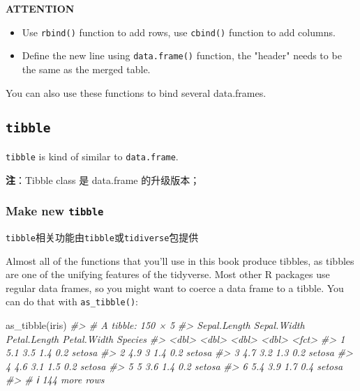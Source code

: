 \documentclass[
]{article}
\newenvironment{Shaded}{}{}
\newcommand{\CommentTok}[1]{\textcolor[rgb]{0.38,0.63,0.69}{\textit{#1}}}
\newcommand{\FunctionTok}[1]{\textcolor[rgb]{0.02,0.16,0.49}{#1}}
\newcommand{\NormalTok}[1]{#1}
\begin{document}
\newpage
\textbf{ATTENTION}

\begin{itemize}
\item
  Use \texttt{rbind()} function to add rows, use \texttt{cbind()}
  function to add columns.
\item
  Define the new line using \texttt{data.frame()} function, the "header"
  needs to be the same as the merged table.
\end{itemize}

You can also use these functions to bind several data.frames.

\hypertarget{tibble}{%
\subsection{\texorpdfstring{\texttt{tibble}}{tibble}}\label{tibble}}

\texttt{tibble} is kind of similar to \texttt{data.frame}.

\textbf{注}：Tibble class 是 data.frame 的升级版本；

\hypertarget{make-new-tibble}{%
\subsubsection{\texorpdfstring{Make new
\texttt{tibble}}{Make new tibble}}\label{make-new-tibble}}

\texttt{tibble}相关功能由\texttt{tibble}或\texttt{tidiverse}包提供

Almost all of the functions that you'll use in this book produce
tibbles, as tibbles are one of the unifying features of the tidyverse.
Most other R packages use regular data frames, so you might want to
coerce a data frame to a tibble. You can do that with
\texttt{as\_tibble()}:

\begin{Shaded}
\begin{Highlighting}[]
\FunctionTok{as\_tibble}\NormalTok{(iris)}
\CommentTok{\#\textgreater{} \# A tibble: 150 × 5}
\CommentTok{\#\textgreater{}   Sepal.Length Sepal.Width Petal.Length Petal.Width Species}
\CommentTok{\#\textgreater{}          \textless{}dbl\textgreater{}       \textless{}dbl\textgreater{}        \textless{}dbl\textgreater{}       \textless{}dbl\textgreater{} \textless{}fct\textgreater{}  }
\CommentTok{\#\textgreater{} 1          5.1         3.5          1.4         0.2 setosa }
\CommentTok{\#\textgreater{} 2          4.9         3            1.4         0.2 setosa }
\CommentTok{\#\textgreater{} 3          4.7         3.2          1.3         0.2 setosa }
\CommentTok{\#\textgreater{} 4          4.6         3.1          1.5         0.2 setosa }
\CommentTok{\#\textgreater{} 5          5           3.6          1.4         0.2 setosa }
\CommentTok{\#\textgreater{} 6          5.4         3.9          1.7         0.4 setosa }
\CommentTok{\#\textgreater{} \# ℹ 144 more rows}
\end{Highlighting}
\end{Shaded}
\end{document}
